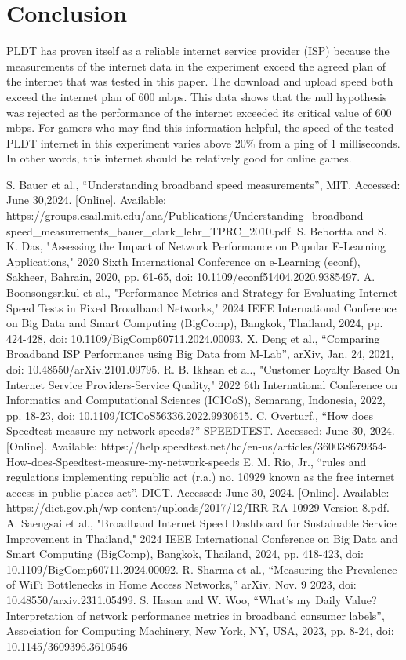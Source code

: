 \documentclass[conference]{IEEEtran}
\begin{document}
\section{Conclusion}
PLDT has proven itself as a reliable internet service provider (ISP) because the measurements of the internet data in the experiment exceed the agreed plan of the internet that was tested in this paper. 
The download and upload speed both exceed the internet plan of 600 mbps. This data shows that the null hypothesis was rejected as the performance of the internet exceeded its critical value of 600 mbps. 
For gamers who may find this information helpful, the speed of the tested PLDT internet in this experiment varies above 20\% from a ping of 1 milliseconds. 
In other words, this internet should be relatively good for online games.

\begin{thebibliography}{00}
 S. Bauer et al., “Understanding broadband speed measurements”, MIT. Accessed: June 30,2024. [Online]. Available: https://groups.csail.mit.edu/ana/Publications/Understanding\_broadband\_
speed\_measurements\_bauer\_clark\_lehr\_TPRC\_2010.pdf.
 S. Bebortta and S. K. Das, "Assessing the Impact of Network Performance on Popular E-Learning Applications," 2020 Sixth International Conference on e-Learning (econf), Sakheer, Bahrain, 2020, pp. 61-65, doi: 10.1109/econf51404.2020.9385497.
 A. Boonsongsrikul et al., "Performance Metrics and Strategy for Evaluating Internet Speed Tests in Fixed Broadband Networks," 2024 IEEE International Conference on Big Data and Smart Computing (BigComp), Bangkok, Thailand, 2024, pp. 424-428, doi: 10.1109/BigComp60711.2024.00093.
 X. Deng et al., “Comparing Broadband ISP Performance using Big Data from M-Lab”, arXiv, Jan. 24, 2021, doi: 10.48550/arXiv.2101.09795.
 R. B. Ikhsan et al., "Customer Loyalty Based On Internet Service Providers-Service Quality," 2022 6th International Conference on Informatics and Computational Sciences (ICICoS), Semarang, Indonesia, 2022, pp. 18-23, doi: 10.1109/ICICoS56336.2022.9930615.
 C. Overturf., “How does Speedtest measure my network speeds?” SPEEDTEST. Accessed: June 30, 2024. [Online]. Available: https://help.speedtest.net/hc/en-us/articles/360038679354-How-does-Speedtest-measure-my-network-speeds
 E. M. Rio, Jr.,  “rules and regulations implementing republic act (r.a.) no. 10929 known as the free internet access in public places act”. DICT. Accessed: June 30, 2024. [Online]. Available: https://dict.gov.ph/wp-content/uploads/2017/12/IRR-RA-10929-Version-8.pdf.
 A. Saengsai et al., "Broadband Internet Speed Dashboard for Sustainable Service Improvement in Thailand," 2024 IEEE International Conference on Big Data and Smart Computing (BigComp), Bangkok, Thailand, 2024, pp. 418-423, doi: 10.1109/BigComp60711.2024.00092. 
 R. Sharma et al., “Measuring the Prevalence of WiFi Bottlenecks in Home Access Networks,” arXiv, Nov. 9 2023, doi: 10.48550/arxiv.2311.05499.
 S. Hasan and W. Woo, “What's my Daily Value? Interpretation of network performance metrics in broadband consumer labels”, Association for Computing Machinery, New York, NY, USA, 2023, pp. 8-24, doi: 10.1145/3609396.3610546

\end{thebibliography}
\end{document}
